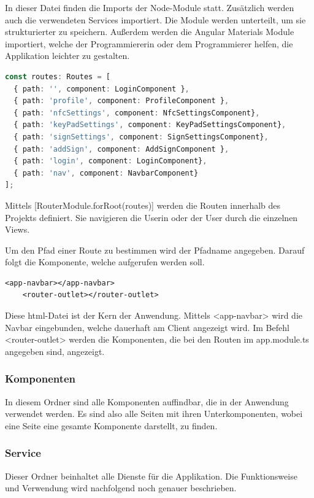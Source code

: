 In dieser Datei finden die Imports der Node-Module statt. Zusätzlich werden auch die verwendeten Services importiert. Die Module werden unterteilt, um sie strukturierter zu speichern. Außerdem werden die Angular Materials Module importiert, welche der Programmiererin oder dem Programmierer helfen, die Applikation leichter zu gestalten. 

\begin{lstlisting}[language=typescript, caption=Routing der Komponenten in der app.module.ts]
const routes: Routes = [
  { path: '', component: LoginComponent },
  { path: 'profile', component: ProfileComponent },
  { path: 'nfcSettings', component: NfcSettingsComponent},
  { path: 'keyPadSettings', component: KeyPadSettingsComponent},
  { path: 'signSettings', component: SignSettingsComponent},
  { path: 'addSign', component: AddSignComponent },
  { path: 'login', component: LoginComponent},
  { path: 'nav', component: NavbarComponent}
];
\end{lstlisting}

Mittels [RouterModule.forRoot(routes)] werden die Routen innerhalb des Projekts definiert. Sie navigieren die Userin oder der User durch die einzelnen Views.

Um den Pfad einer Route zu bestimmen wird der Pfadname angegeben.  Darauf folgt die Komponente, welche aufgerufen werden soll.

\begin{lstlisting}[caption=app.component.html]
    <app-navbar></app-navbar>
    <router-outlet></router-outlet>    
\end{lstlisting}

Diese html-Datei ist der Kern der Anwendung. Mittels <app-navbar> wird die Navbar eingebunden, welche dauerhaft am Client angezeigt wird. Im Befehl <router-outlet> werden die Komponenten, die bei den Routen im app.module.ts angegeben sind, angezeigt.

\subsubsection{Komponenten}
In diesem Ordner sind alle Komponenten auffindbar, die in der Anwendung verwendet werden. Es sind also alle Seiten mit ihren Unterkomponenten, wobei eine Seite eine gesamte Komponente darstellt, zu finden.

\subsubsection{Service}
Dieser Ordner beinhaltet alle Dienste für die Applikation. Die Funktionsweise und Verwendung wird nachfolgend noch genauer beschrieben.

